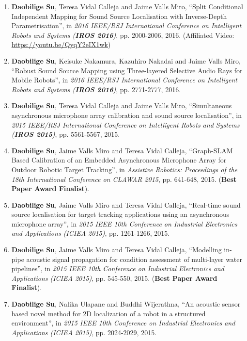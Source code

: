 \documentclass[margin,line]{res}
\begin{document}
\begin{resume}
\begin{enumerate}
\item {\bf Daobilige Su}, Teresa Vidal Calleja and Jaime Valls Miro, ``Split Conditional Independent Mapping for Sound Source Localisation with Inverse-Depth Parametrisation'', in {\it 2016 IEEE/RSJ International Conference on Intelligent Robots and Systems (\textbf{IROS 2016})}, pp. 2000-2006, 2016. (Affiliated Video: \href{https://youtu.be/QyqY2eIX1wk}{{https://youtu.be/QyqY2eIX1wk}})

\item {\bf Daobilige Su}, Keisuke Nakamura, Kazuhiro Nakadai and Jaime Valls Miro, ``Robust Sound Source Mapping using Three-layered Selective Audio Rays for Mobile Robots'', in {\it 2016 IEEE/RSJ International Conference on Intelligent Robots and Systems (\textbf{IROS 2016})}, pp. 2771-2777, 2016.

\item {\bf Daobilige Su}, Teresa Vidal Calleja and Jaime Valls Miro, ``Simultaneous asynchronous microphone array calibration and sound source localisation'', in {\it 2015 IEEE/RSJ International Conference on Intelligent Robots and Systems (\textbf{IROS 2015})}, pp. 5561-5567, 2015.

\item {\bf Daobilige Su}, Jaime Valls Miro and Teresa Vidal Calleja, ``Graph-SLAM Based Calibration of an Embedded Asynchronous Microphone Array for Outdoor Robotic Target Tracking'', in {\it Assistive Robotics: Proceedings of the 18th International Conference on CLAWAR 2015}, pp. 641-648, 2015. ({\bf Best Paper Award Finalist}).

\item {\bf Daobilige Su}, Jaime Valls Miro and Teresa Vidal Calleja, ``Real-time sound source localisation for target tracking applications using an asynchronous microphone array'', in {\it 2015 IEEE 10th Conference on Industrial Electronics and Applications (ICIEA 2015)}, pp. 1261-1266, 2015.

\item {\bf Daobilige Su}, Jaime Valls Miro and Teresa Vidal Calleja, ``Modelling in-pipe acoustic signal propagation for condition assessment of multi-layer water pipelines'', in {\it 2015 IEEE 10th Conference on Industrial Electronics and Applications (ICIEA 2015)}, pp. 545-550, 2015. ({\bf Best Paper Award Finalist}).

\item {\bf Daobilige Su}, Nalika Ulapane and Buddhi Wijerathna, ``An acoustic sensor based novel method for 2D localization of a robot in a structured environment'', in {\it 2015 IEEE 10th Conference on Industrial Electronics and Applications (ICIEA 2015)}, pp. 2024-2029, 2015.


\end{enumerate}
\end{resume}
\end{document}
